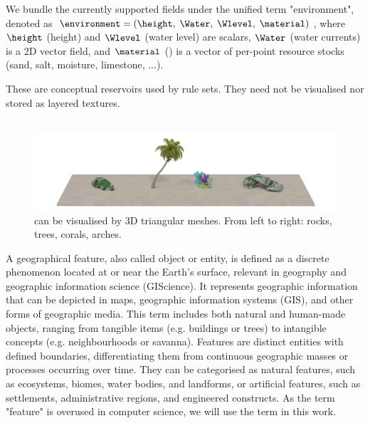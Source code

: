 We bundle the currently supported fields under the unified term "environment", denoted as $\environment = (\height, \; \Water, \; \Wlevel, \; \material)$,
where $\height$ (height) and $\Wlevel$ (water level) are scalars, $\Water$ (water currents) is a 2D vector field, and $\material$ () is a vector of per-point resource stocks (sand, salt, moisture, limestone, ...).

These  are conceptual reservoirs used by rule sets. They need not be visualised nor stored as layered textures.

\subsection{}
\label{sec:env-obj-environmental-objects}

\begin{figure}
\includegraphics{assets-demo.pdf}
\caption{ can be visualised by 3D triangular meshes. From left to right: rocks, trees, corals, arches.}
\label{fig:env-obj-assets}
\end{figure}

A geographical feature, also called object or entity, is defined as a discrete phenomenon located at or near the Earth's surface, relevant in geography and geographic information science (GIScience). It represents geographic information that can be depicted in maps, geographic information systems (GIS), and other forms of geographic media. This term includes both natural and human-made objects, ranging from tangible items (e.g. buildings or trees) to intangible concepts (e.g. neighbourhoods or savanna). Features are distinct entities with defined boundaries, differentiating them from continuous geographic masses or processes occurring over time. They can be categorised as natural features, such as ecosystems, biomes, water bodies, and landforms, or artificial features, such as settlements, administrative regions, and engineered constructs. As the term "feature" is overused in computer science, we will use the term  in this work.

